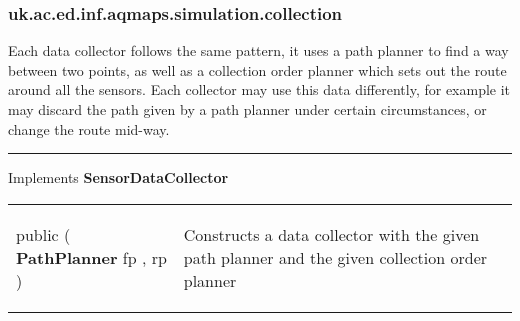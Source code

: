 \subsubsection*{ uk.ac.ed.inf.aqmaps.simulation.collection }
 {\scriptsize Each data collector follows the same pattern, it uses a path planner to find a way between two points, as well as a collection order planner which\newline%
 sets out the route around all the sensors. Each collector may use this data differently, for example it may discard the path given by a path planner under certain circumstances, or change the route mid{-}way.
 
\vspace*{4pt} \hrule \vspace*{3pt}
Implements \textbf{ SensorDataCollector }
\vspace*{-5pt} 
\begin{tabularx}{\linewidth}{X|m{}}
\label{tab:BaseDataCollector}
\begin{raggedleft}public  \textbf{\hyperref[tab:BaseDataCollector]{\color{blue}{BaseDataCollector}} }(\newline \hfill 
\hspace*{ 5pt} \textbf{PathPlanner} fp , \newline
 \hspace*{ 5pt} \textbf{\hyperref[tab:BaseCollectionOrderPlanner]{\color{blue}{BaseCollectionOrderPlanner}}} rp  )
\end{raggedleft} &
 Constructs a data collector with the given path planner and the given collection order planner\\\end{tabularx}
}
